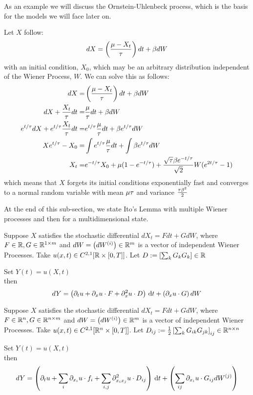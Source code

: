 As an example we will discuss the Ornstein-Uhlenbeck process, which is the
basis for the models we will face later on.
\begin{ex}[O-U Process] Let $X$ follow:
\begin{equation}
dX = \left( \frac {{\mu } -X_t}{{ \tau }} \right) dt + \beta dW
\label{eq:OU_equation_generic}
\end{equation}
with an initial condition, $X_0$, which may be an arbitrary distribution
independent of the Wiener Process, $W$.
We can solve this as follows:
\begin{align*}
dX =& \left( \frac {{\mu } -X_t}{{ \tau }} \right)  dt + \beta dW
\\
dX + \frac {X_t}{{ \tau }} dt=&  \frac{{\mu }}{{ \tau }} dt + \beta dW
\\
e^{t/{ \tau }} dX + e^{t/{ \tau }}\frac {X_t}{{ \tau }} dt
=& e^{t/{ \tau }}\frac{{\mu }}{{ \tau }} dt + \beta e^{t/{ \tau }} dW
\\
Xe^{t/{ \tau }} - X_0 
=& \int  e^{t/{ \tau }}\frac{{\mu }}{{ \tau }} dt +  \int \beta e^{t/{ \tau }} dW
\\
X_t =& e^{-t/{ \tau }} X_0 + {\mu }(1-e^{-t/{ \tau }}) +  \frac{\sqrt{{ \tau }}\beta
e^{-t/{ \tau }}}{\sqrt{2}} W(e^{2t/{ \tau }}-1)
\end{align*}
which means that $X$ forgets its initial conditions exponentially fast and
converges to a normal random variable with mean ${\mu }{ \tau }$ and variance
$\tfrac{{ \tau } \beta^2}{2}$
\end{ex}

At the end of this sub-section, we state Ito's Lemma with multiple Wiener
processes and then for a multidimensional state.

\begin{thm} Suppose $X$ satisfies the stochastic
differential $dX_t = F dt + G dW$, where $ F \in { \mathbb{R} }, G \in { \mathbb{R} }^{1\times m}$ and
$dW = \left(dW^{(i)}\right) \in  { \mathbb{R} }^{m}$ is a vector of independent Wiener
Processes. Take $u(x,t) \in C^{2,1}[ { \mathbb{R} } \times [0,T]]$. Let $D :=\left[{\sum_k
G_{k} G_{k} } \right] \in { \mathbb{R} }$

Set $Y(t) = u(X,t)$
\\
then
$$
dY =  \left( {\partial}_t u +  {\partial}_{x} u \cdot F + 
  {\partial}^2_{x} u \cdot D \right)
\, \mathrm{d} t +
 \left(  {\partial}_{x} u  \cdot  G \right) dW  
$$
\end{thm}

\begin{thm}
Suppose $X$ satisfies the stochastic differential $dX_t = F dt + G dW$, where $
F \in { \mathbb{R} }^n, G \in { \mathbb{R} }^{n\times m}$ and $dW = \left(dW^{(i)}\right) \in  { \mathbb{R} }^{ 
m}$ is a vector of independent Wiener Processes. Take $u(x,t) \in C^{2,1}[ { \mathbb{R} }^n
\times [0,T]]$. Let $D_{ij} := \tfrac{1}{2} \left[{\sum_k G_{ik} G_{jk} }
\right]_{ij} \in { \mathbb{R} }^{n\times n} $

Set $Y(t) = u(X,t)$
\\
then
$$
dY =  \left( {\partial}_t u + \sum_i {\partial}_{x_i} u \cdot f_i + 
\sum_{i,j} {\partial}^2_{x_i x_j} u \cdot D_{ij} \right)
\, \mathrm{d} t +
 \left(  \sum_{ij} {\partial}_{x_i} u  \cdot G_{ij} dW^{(j)} 
\right)$$
\end{thm} 

